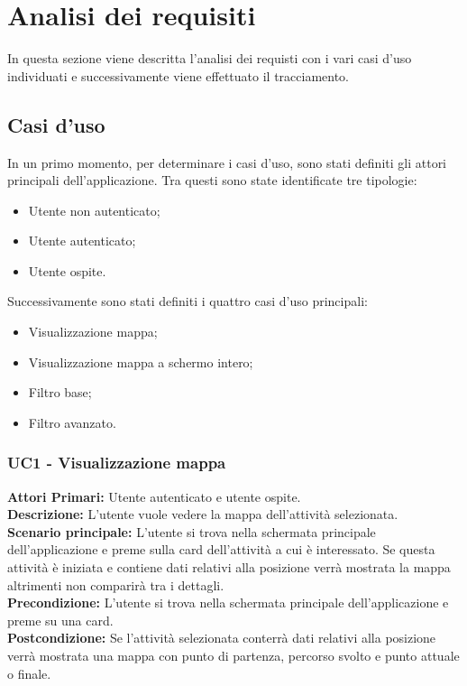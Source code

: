 \section{Analisi dei requisiti}
In questa sezione viene descritta l'analisi dei requisti con i  vari casi d'uso individuati e successivamente viene effettuato il tracciamento.

\subsection{Casi d'uso}
In un primo momento, per determinare i casi d'uso, sono stati definiti gli attori principali dell'applicazione.
Tra questi sono state identificate tre tipologie:
\begin{itemize}
	\item Utente non autenticato;
	\item Utente autenticato;
	\item Utente ospite.
\end{itemize}
Successivamente sono stati definiti i quattro casi d'uso principali:
\begin{itemize}
	\item Visualizzazione mappa;
	\item Visualizzazione mappa a schermo intero;
	\item Filtro base;
	\item Filtro avanzato.
\end{itemize}


\subsubsection{ UC1 - Visualizzazione mappa}

	\textbf{Attori Primari:} Utente autenticato e utente ospite.\\
	\textbf{Descrizione:} L'utente vuole vedere la mappa dell'attività selezionata.\\
	\textbf{Scenario principale:} L'utente si trova nella schermata principale dell'applicazione e preme sulla card dell'attività a cui è interessato. Se questa attività è iniziata e contiene dati relativi alla posizione verrà mostrata la mappa altrimenti non comparirà tra i dettagli.\\
	\textbf{Precondizione:} L'utente si trova nella schermata principale dell'applicazione e preme su una card.\\
	\textbf{Postcondizione:} Se l'attività selezionata conterrà dati relativi alla posizione verrà mostrata una mappa con punto di partenza, percorso svolto e punto attuale o finale.\\


